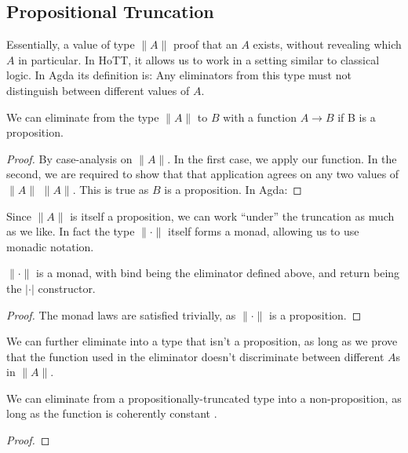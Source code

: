 \begin{refsection}
\begin{subappendices}
\subsection{Propositional Truncation} \label{prop-trunc}
Essentially, a value of type \(\lVert A \rVert\) proof that an \(A\) exists,
without revealing which \(A\) in particular.
In HoTT, it allows us to work in a setting similar to classical logic.
In Agda its definition is:
Any eliminators from this type must not distinguish between different values of
\(A\).

\begin{lemma}
  We can eliminate from the type \(\lVert A \rVert\) to \(B\) with a function
  \(A \rightarrow B\) if B is a proposition.
\end{lemma}
\begin{proof}
  By case-analysis on \(\lVert A \rVert\).
  In the first case, we apply our function.
  In the second, we are required to show that that application agrees on any two
  values of \(\lVert A \rVert\) \(\lVert A \rVert\).
  This is true as \(B\) is a proposition.
  In Agda:
\end{proof}

Since \(\lVert A \rVert\) is itself a proposition, we can work ``under'' the
truncation as much as we like.
In fact the type \(\lVert \cdot \rVert\) itself forms a monad, allowing us to
use monadic notation.
\begin{lemma}
  \(\lVert \cdot \rVert\) is a monad, with bind being the eliminator defined
  above, and return being the \(\lvert \cdot \rvert\) constructor.
\end{lemma}
\begin{proof}
  The monad laws are satisfied trivially, as \(\lVert \cdot \rVert\) is a
  proposition.
\end{proof}

We can further eliminate into a type that isn't a proposition, as long as we
prove that the function used in the eliminator doesn't discriminate between
different \(A\)s in \(\lVert A \rVert\).
\begin{lemma} \label{elim-non-prop}
  We can eliminate from a propositionally-truncated type into a non-proposition,
  as long as the function is coherently constant
  \cite{krausGeneralUniversalProperty2015}.
\end{lemma}
\begin{proof}
\end{proof}


\end{subappendices}
\end{refsection}
